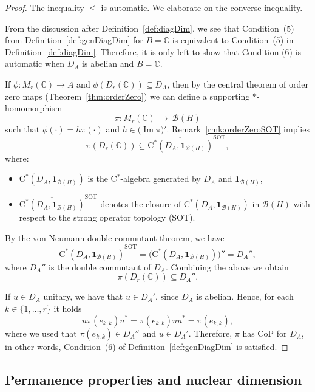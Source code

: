 \documentclass[a4paper]{amsart}
\newcommand{\myhyp}{\textnormal{-}\hskip0pt\relax}
\numberwithin{equation}{section}
\newcommand{\C}{\mathbb{C}}
\newcommand{\Bcal}{\mathcal{B}}
\newcommand{\cstar}{C$^\ast$\myhyp{}algebra}
\newcommand{\calg}[1]{\mathrm{C}^\ast({#1})}
\newcommand{\bop}[1]{\Bcal({#1})}
\newcommand{\rAr}{\longrightarrow}
\newcommand{\prn}[1]{{(#1)}}
\DeclareMathOperator{\img}{Im}
\newcommand{\CoProp}[1]{CoP for ${#1}$}
\theoremstyle{plain}
\theoremstyle{indented}
\numberwithin{equation}{section}
\theoremstyle{definition}
\theoremstyle{remark}
\theoremstyle{plain}
\theoremstyle{definition}
\begin{document}
\begin{proof}
    The inequality $\le$ is automatic. We elaborate on the converse
    inequality.

    From the discussion after Definition~\ref{def:diagDim}, we see that Condition~(5) 
    from Definition~\ref{def:genDiagDim} for $B=\C$
    is equivalent to Condition~(5) in Definition~\ref{def:diagDim}. 
    Therefore, it is only left to show that Condition (6) is automatic when $D_A$ is abelian and $B=\C$.
    
    If ${\phi \colon M_r(\C) \rAr A}$ and ${\phi(D_r(\C)) \subseteq D_A}$, 
    then by the central theorem of order zero maps (Theorem~\ref{thm:orderZero}) 
    we can define a supporting  $\ast$\myhyp{}homomorphism 
    \[\pi \colon M_r(\C)~\rAr~\bop{H}\]
    such that ${\phi\prn{\cdot} = h \pi \prn{\cdot}}$
    and
    ${h \in \big(\img{\pi}\big)'}$. 
    Remark~\ref{rmk:orderZeroSOT} implies
    \[\pi(D_r(\C)) \subseteq \overline{\calg{D_A, \mathbf{1}_{\bop{H}}}}^{\mathrm{SOT}}, \]
    where:
    \begin{itemize}
        \item ${\calg{D_A, \mathbf{1}_{\bop{H}}} }$ is the \cstar{} generated  by $D_A$ and ${\mathbf{1}_{\bop{H}}}$,
        \item ${\overline{\calg{D_A, \mathbf{1}_{\bop{H}}}}^{\mathrm{SOT}}}$ 
        denotes the closure of ${\calg{D_A, \mathbf{1}_{\bop{H}}}}$ in $\bop{H}$ with respect to the strong operator topology (SOT).
    \end{itemize}

    By the von Neumann double commutant theorem, we have
    \[ \overline{\calg{D_A, \mathbf{1}_{\bop{H}}}}^{\mathrm{SOT}} =  \big({\calg{D_A, \mathbf{1}_{\bop{H}}}}\big)'' = {D_A}'',\] where ${D_A}''$ is the double commutant of ${D_A}$.
    Combining the above we obtain
     \[{\pi(D_r(\mathbb{C})) \subseteq D_A{''}}.\] 
    
    If ${u \in D_A}$ unitary, we have that ${u \in {D_A}'}$, since $D_A$ is abelian. 
    Hence, for each ${k \in \{1,\hdots,r\}}$ it holds
    \[  u \pi(e_{k,k}) u^{\ast} =   \pi(e_{k,k}) u u^{\ast} = \pi(e_{k,k}), \]
    where we used that ${\pi(e_{k,k}) \in {D_A}''}$ and ${u \in {D_A}'}$. Therefore, $\pi$ has \CoProp{D_A}, in other words,
    Condition~(6) of Definition~\ref{def:genDiagDim} is satisfied. \qedhere  
\end{proof}

\medskip
\subsection{Permanence properties and nuclear dimension}
\end{document}

